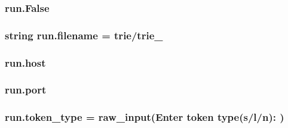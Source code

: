 \subsubsection[{\texorpdfstring{False}{False}}]{\setlength{\rightskip}{0pt plus 5cm}run.\+False}\hypertarget{namespacerun_aaeb0dc8420ee07880d7768c73bb3564a}{}\label{namespacerun_aaeb0dc8420ee07880d7768c73bb3564a}
\subsubsection[{\texorpdfstring{filename}{filename}}]{\setlength{\rightskip}{0pt plus 5cm}string run.\+filename = \textquotesingle{}trie/trie\+\_\+\textquotesingle{}}\hypertarget{namespacerun_afdbd074667ab498dc4283bd9f6024021}{}\label{namespacerun_afdbd074667ab498dc4283bd9f6024021}
\subsubsection[{\texorpdfstring{host}{host}}]{\setlength{\rightskip}{0pt plus 5cm}run.\+host}\hypertarget{namespacerun_af7767eb404b922097d7206695c016bad}{}\label{namespacerun_af7767eb404b922097d7206695c016bad}
\subsubsection[{\texorpdfstring{port}{port}}]{\setlength{\rightskip}{0pt plus 5cm}run.\+port}\hypertarget{namespacerun_a7a6a5c33b9e900b36c2b941d5212210e}{}\label{namespacerun_a7a6a5c33b9e900b36c2b941d5212210e}
\subsubsection[{\texorpdfstring{token\+\_\+type}{token_type}}]{\setlength{\rightskip}{0pt plus 5cm}run.\+token\+\_\+type = raw\+\_\+input(\textquotesingle{}Enter token {\bf type}(s/l/n)\+: \textquotesingle{})}\hypertarget{namespacerun_a3aa049fb1bff73ee4abc5c3807357b14}{}\label{namespacerun_a3aa049fb1bff73ee4abc5c3807357b14}
